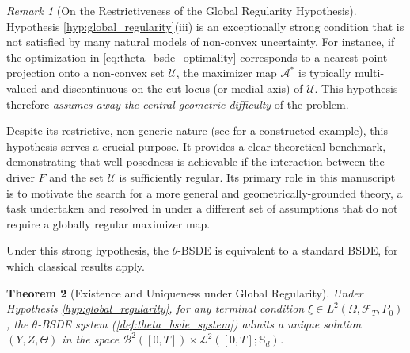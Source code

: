 \documentclass[12pt, letterpaper]{amsart}
\newcommand{\Thetacal}{\mathcal{A}}
\newcommand{\Ucal}{\mathcal{U}}
\newcommand{\Bcal}{\mathcal{B}}
\newcommand{\Lcalp}[1]{\mathcal{L}^{#1}}
\newcommand{\Sd}{\mathbb{S}_d}
\theoremstyle{plain}
\newtheorem{theorem}{Theorem}[section]
\theoremstyle{definition}
\theoremstyle{remark}
\newtheorem{remark}[theorem]{Remark}
\numberwithin{equation}{section} %
\begin{document}
\begin{remark}[On the Restrictiveness of the Global Regularity Hypothesis]
\label{rem:restrictiveness}
Hypothesis \ref{hyp:global_regularity}(iii) is an exceptionally strong condition that is not satisfied by many natural models of non-convex uncertainty. For instance, if the optimization in \eqref{eq:theta_bsde_optimality} corresponds to a nearest-point projection onto a non-convex set $\Ucal$, the maximizer map $\Thetacal^*$ is typically multi-valued and discontinuous on the cut locus (or medial axis) of $\Ucal$. This hypothesis therefore \emph{assumes away the central geometric difficulty} of the problem.

Despite its restrictive, non-generic nature (see  for a constructed example), this hypothesis serves a crucial purpose. It provides a clear theoretical benchmark, demonstrating that well-posedness is achievable if the interaction between the driver $F$ and the set $\Ucal$ is sufficiently regular. Its primary role in this manuscript is to motivate the search for a more general and geometrically-grounded theory, a task undertaken and resolved in  under a different set of assumptions that do not require a globally regular maximizer map.
\end{remark}

Under this strong hypothesis, the $\theta$-BSDE is equivalent to a standard BSDE, for which classical results apply.

\begin{theorem}[Existence and Uniqueness under Global Regularity]
\label{thm:theta_bsde_wellposedness}
Under Hypothesis \ref{hyp:global_regularity}, for any terminal condition $\xi \in L^2(\Omega, \mathcal{F}_T, P_0)$, the $\theta$-BSDE system (\cref{def:theta_bsde_system}) admits a unique solution $(Y, Z, \Theta)$ in the space $\Bcal^2([0,T]) \times \Lcalp{2}([0,T]; \Sd)$.
\end{theorem}
\end{document}
